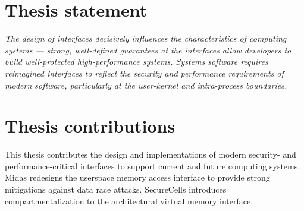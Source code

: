 


\section{Thesis statement}

\begin{center}
\emph{
The design of interfaces decisively influences the characteristics of 
computing systems --- 
strong, well-defined guarantees at the interfaces allow developers to build 
well-protected high-performance systems.
Systems software requires reimagined interfaces to reflect the security
and performance requirements of modern software, particularly at the 
user-kernel and intra-process boundaries.
}
\end{center}

\section{Thesis contributions}

This thesis contributes the design and implementations of modern
security- and performance-critical interfaces to support 
current and future computing systems.
Midas redesigns the userspace memory access interface to provide
strong mitigations against data race attacks.
SecureCells introduces compartmentalization to the architectural
virtual memory interface.

